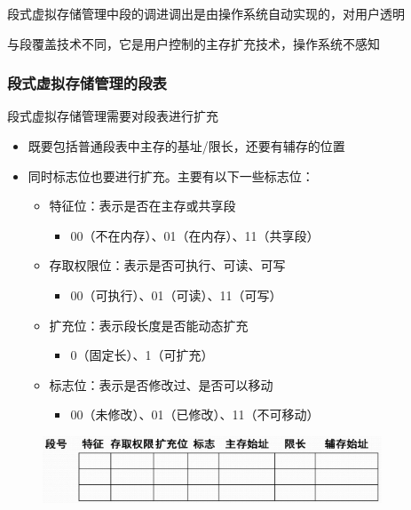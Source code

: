\documentclass[cs4size,a4paper,10pt]{ctexart}
\begin{document}
		段式虚拟存储管理中段的调进调出是由操作系统自动实现的，对用户透明

		与段覆盖技术不同，它是用户控制的主存扩充技术，操作系统不感知

		\subsubsection{段式虚拟存储管理的段表}
		段式虚拟存储管理需要对段表进行扩充
		\begin{itemize}
			\item 既要包括普通段表中主存的基址/限长，还要有辅存的位置
			\item 同时标志位也要进行扩充。主要有以下一些标志位：
			\begin{itemize}
				\item 特征位：表示是否在主存或共享段
				\begin{itemize}
					\item 00（不在内存）、01（在内存）、11（共享段）
				\end{itemize}
				\item 存取权限位：表示是否可执行、可读、可写
				\begin{itemize}
					\item 00（可执行）、01（可读）、11（可写）
				\end{itemize}
				\item 扩充位：表示段长度是否能动态扩充
				\begin{itemize}
					\item 0（固定长）、1（可扩充）
				\end{itemize}
				\item 标志位：表示是否修改过、是否可以移动
				\begin{itemize}
					\item 00（未修改）、01（已修改）、11（不可移动）
				\end{itemize}
			\end{itemize}
		\end{itemize}
		\begin{figure}[H]
			\centering
			\includegraphics[width=0.9\textwidth]{img/3.4.2.2}
		\end{figure}
\end{document}
